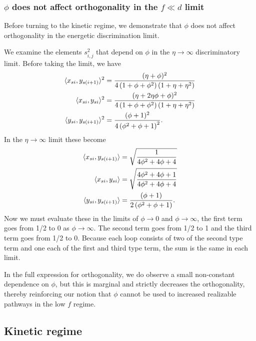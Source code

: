 \subsubsection{$\phi$ does not affect orthogonality in the $f\ll d$ limit}

Before turning to the kinetic regime, we demonstrate that $\phi$ does not affect orthogonality in the energetic discrimination limit.


We examine the elements $s^2_{i,j}$ that depend on $\phi$ in the $\eta\to\infty$ discriminatory limit.  Before taking the limit, we have
\[
\begin{aligned}
\langle x_{si}, y_{s(i+1)} \rangle^2 &=\frac{(\eta+\phi)^2}{4 \left(1+ \phi+\phi^2\right) \left(1+\eta+\eta^2\right)}\\
\langle x_{si}, y_{si}\rangle^2 &=\frac{(\eta+2 \eta \phi+ \phi)^2}{4 \left(1+\phi+\phi^2\right) \left(1+\eta+\eta^2\right)}\\
\langle y_{si}, y_{s(i+1)}\rangle^2 &=\frac{(\phi +1)^2}{4 \left(\phi ^2+\phi +1\right)^2}.\\
\end{aligned}
\]
In the $\eta\to\infty$ limit these become
\[
\begin{aligned}
\langle x_{si}, y_{s(i+1)} \rangle &=\sqrt{\frac{1}{4 \phi ^2+4 \phi +4}}\\
\langle x_{si}, y_{si}\rangle &=\sqrt{\frac{4 \phi ^2+4 \phi +1}{4 \phi ^2+4 \phi +4}}\\
\langle y_{si}, y_{s(i+1)}\rangle &=\frac{(\phi +1)}{2 \left(\phi ^2+\phi +1\right)}.\\
\end{aligned}
\]
Now we must evaluate  these in the limits of $\phi\to 0$ and $\phi\to\infty$, the first term goes from 1/2 to 0 as $\phi\to\infty$.  The second term goes from 1/2 to 1 and the third term goes from 1/2 to 0.  Because each loop consists of two of the second type term and one each of the first and third type term, the sum is the same in each limit.  

In the full expression for orthogonality, we do observe a small non-constant dependence on $\phi$, but this is marginal and strictly decreases the orthogonality, thereby reinforcing our notion that $\phi$ cannot be used to increased realizable pathways in the low $f$ regime.  

\subsection{Kinetic regime}


